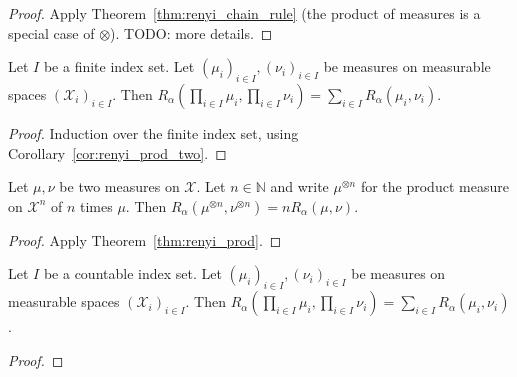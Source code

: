\begin{proof}
Apply Theorem~\ref{thm:renyi_chain_rule} (the product of measures is a special case of $\otimes$). TODO: more details.
\end{proof}

\begin{theorem}
  \label{thm:renyi_prod}
  Let $I$ be a finite index set. Let $(\mu_i)_{i \in I}, (\nu_i)_{i \in I}$ be measures on measurable spaces $(\mathcal X_i)_{i \in I}$.
  Then $R_\alpha (\prod_{i \in I} \mu_i, \prod_{i \in I} \nu_i) = \sum_{i \in I} R_\alpha(\mu_i, \nu_i)$.
\end{theorem}

\begin{proof}
Induction over the finite index set, using Corollary~\ref{cor:renyi_prod_two}.
\end{proof}

\begin{corollary}
  \label{lem:renyi_prod_n}
  Let $\mu, \nu$ be two measures on $\mathcal X$. Let $n \in \mathbb{N}$ and write $\mu^{\otimes n}$ for the product measure on $\mathcal X^n$ of $n$ times $\mu$.
  Then $R_\alpha(\mu^{\otimes n}, \nu^{\otimes n}) = n R_\alpha(\mu, \nu)$.
\end{corollary}

\begin{proof}
Apply Theorem~\ref{thm:renyi_prod}.
\end{proof}

\begin{theorem}
  \label{thm:renyi_prod_countable}
  Let $I$ be a countable index set. Let $(\mu_i)_{i \in I}, (\nu_i)_{i \in I}$ be measures on measurable spaces $(\mathcal X_i)_{i \in I}$.
  Then $R_\alpha (\prod_{i \in I} \mu_i, \prod_{i \in I} \nu_i) = \sum_{i \in I} R_\alpha(\mu_i, \nu_i)$.
\end{theorem}

\begin{proof}
\end{proof}
